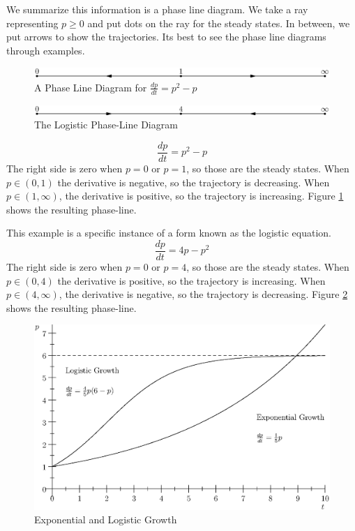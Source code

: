 \documentclass[fleqn,letterpaper]{report}
\begin{document}
We summarize this information is a phase line diagram. We
take a ray representing $p \geq 0$ and put dots on the ray for
the steady states. In between, we put arrows to show the
trajectories. Its best to see the phase line diagrams through
examples.

\begin{figure}[t]
\centering
\includegraphics[width=12cm]{figure02.eps}
\caption{A Phase Line Diagram for $\frac{dp}{dt} = p^2 - p$}
\label{figure-phase-line1}
\end{figure}

\begin{figure}[t]
\centering
\includegraphics[width=12cm]{figure03.eps}
\caption{The Logistic Phase-Line Diagram}
\label{figure-logistic-phase-line}
\end{figure}

\begin{example}
\begin{example}
\begin{equation*}
\frac{dp}{dt} = p^2 - p
\end{equation*}
The right side is zero when $p=0$ or $p=1$, so those are the
steady states. When $p \in (0,1)$ the derivative is negative,
so the trajectory is decreasing. When $p \in (1, \infty)$, the
derivative is positive, so the trajectory is increasing.
Figure \ref{figure-phase-line1} shows the resulting
phase-line.
\end{example}

This example is a specific instance of a form known as the
logistic equation.
\begin{equation*}
\frac{dp}{dt} = 4p-p^2
\end{equation*}
The right side is zero when $p=0$ or $p=4$, so those are the
steady states. When $p \in (0,4)$ the derivative is positive,
so the trajectory is increasing. When $p \in (4, \infty)$, the
derivative is negative, so the trajectory is decreasing.
Figure \ref{figure-logistic-phase-line} shows the resulting
phase-line.
\end{example}

\begin{figure}[t]
\centering
\includegraphics[width=12cm]{figure04.eps}
\caption{Exponential and Logistic Growth}
\label{figure-exponential-growth}
\end{figure}
\end{document}
